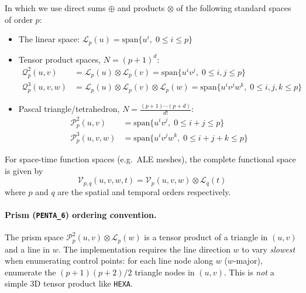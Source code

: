 \documentclass[11pt,letterpaper]{article}
\newenvironment{v2quote}
  {\begin{v2quoteframe}%
   \noindent{\footnotesize\sffamily\bfseries\color{cgnsblue}v2 text}%
   \nopagebreak\par\nopagebreak\vspace{0.15em}}
  {\end{v2quoteframe}}
\newcommand{\Lsp}{\mathcal{L}_p}
\newcommand{\Qtp}{\mathcal{Q}^{2}_p}
\newcommand{\Qthp}{\mathcal{Q}^{3}_p}
\newcommand{\Ptp}{\mathcal{P}^{2}_p}
\newcommand{\Pthp}{\mathcal{P}^{3}_p}
\newcommand{\Vpq}{\mathcal{V}_{p,q}}
\begin{document}
\begin{v2quote}
\noindent In which we use direct sums $\oplus$ and products $\otimes$ of the following standard spaces of order $p$:

\begin{itemize}
  \item The linear space: $\Lsp(u) = \mathrm{span}\{u^i,\; 0 \le i \le p\}$

  \item Tensor product spaces, $N = (p+1)^d$:
  \begin{align*}
    \Qtp(u,v)      &= \Lsp(u) \otimes \Lsp(v)      = \mathrm{span}\{u^i v^j,\; 0 \le i,j \le p\} \\
    \Qthp(u,v,w)   &= \Lsp(u) \otimes \Lsp(v) \otimes \Lsp(w)
                    = \mathrm{span}\{u^i v^j w^k,\; 0 \le i,j,k \le p\}
  \end{align*}

  \item Pascal triangle/tetrahedron, $N = \frac{(p+1)\cdots(p+d)}{d!}$:
  \begin{align*}
    \Ptp(u,v)      &= \mathrm{span}\{u^i v^j,\; 0 \le i+j \le p\} \\
    \Pthp(u,v,w)   &= \mathrm{span}\{u^i v^j w^k,\; 0 \le i+j+k \le p\}
  \end{align*}
\end{itemize}

For space-time function spaces (e.g.\ ALE meshes), the complete functional space is given by
%
\begin{equation}
  \Vpq(u,v,w,t) = \mathcal{V}_p(u,v,w) \otimes \mathcal{L}_q(t)
\end{equation}
%
where $p$ and $q$ are the spatial and temporal orders respectively.
\end{v2quote}

\paragraph{Prism (\texttt{PENTA\_6}) ordering convention.}
The prism space $\Ptp(u,v)\otimes\Lsp(w)$ is a tensor product of a triangle in $(u,v)$ and a
line in $w$.  The implementation requires the line direction $w$ to vary \emph{slowest} when
enumerating control points:  for each line node along $w$ ($w$-major), enumerate the
$(p+1)(p+2)/2$ triangle nodes in $(u,v)$.  This is \emph{not} a simple 3D tensor product like
\texttt{HEXA}.
\end{document}

